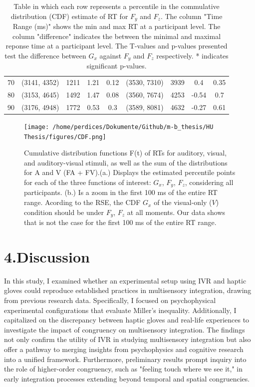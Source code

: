 \documentclass[12pt,oneside,openright]{report}
\begin{document}
\begin{table}[!ht]
{\begin{tabular}{ccccccccc}
    70 & (3141, 4352) & 1211 & 1.21 & 0.12 & (3530, 7310) & 3939 & 0.4 & 0.35 \\
    80 & (3153, 4645) & 1492 & 1.47 & 0.08 & (3560, 7674) & 4253 & -0.54 & 0.7 \\
    90 & (3176, 4948) & 1772 & 0.53 & 0.3 & (3589, 8081) & 4632 & -0.27 & 0.61 \\ \hline
    \end{tabular}}
    \caption{Table in which each row represents a percentile in the commulative distribution (CDF) estimate of RT for $F_y$ and $F_z$. The column "Time Range (ms)" shows the min and max RT at a participant level. The column "difference" indicates the between the minimal and maximal reponse time at a participant level. The T-values and p-values presented test the difference between $G_x$ against $F_y$ and $F_z$ respectively. * indicates significant p-values.}
    \label{tab:response-time-range}
\end{table}


\begin{figure}[!ht]
    \centering
    \texttt{[image: /home/perdices/Dokumente/Github/m-b\_thesis/HU Thesis/figures/CDF.png]}
    \caption{ Cumulative distribution functions F(t) of RTs for auditory, visual,
    and auditory-visual stimuli, as well as the sum of the distributions for A
    and V (FA + FV).(a.) Displays the estimated percentile points for each of the three functions of interest: $G_x$, $F_y$, $F_z$, considering all participants. (b.) Is a zoom in the first 100 ms of the entire RT range. Acording to the RSE, the CDF $G_x$ of the visual-only ($V$) condition should be under $F_y$, $F_z$ at all moments. Our data shows that is not the case for the first 100 ms of the entire RT range.}
    \label{fig:CDF}
\end{figure}


\section*{4.Discussion}

In this study, I examined whether an experimental setup using IVR and haptic gloves could reproduce established practices in multisensory integration, drawing from previous research data. Specifically, I focused on psychophysical experimental configurations that evaluate Miller's inequality. Additionally, I capitalized on the discrepancy between haptic gloves and real-life experiences to investigate the impact of congruency on multisensory integration. The findings not only confirm the utility of IVR in studying multisensory integration but also offer a pathway to merging insights from psychophysics and cognitive research into a unified framework. Furthermore, preliminary results prompt inquiry into the role of higher-order congruency, such as "feeling touch where we see it," in early integration processes extending beyond temporal and spatial congruencies.
\end{document}
